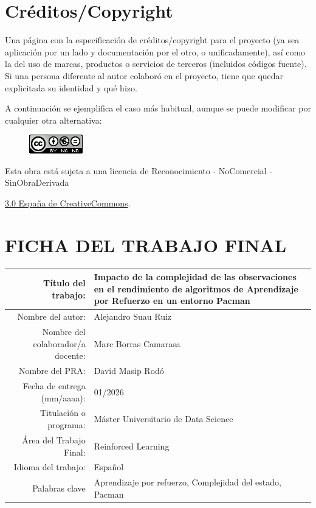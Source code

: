 \hypersetup{pageanchor=false}
\setcounter{page}{1} 
\pagestyle{plain}

\chapter*{Créditos/Copyright}

Una página con la especificación de créditos/copyright para el proyecto (ya sea aplicación por un lado y documentación por el otro, o unificadamente), así como la del uso de marcas, productos o servicios de terceros (incluidos códigos fuente). Si una persona diferente al autor colaboró en el proyecto, tiene que quedar explicitada su identidad y qué hizo.

A continuación se ejemplifica el caso más habitual, aunque se puede modificar por cualquier otra alternativa:

\vspace{1cm}

\begin{figure}[ht]
    \centering
	\includegraphics[scale=1]{images/license.png}
\end{figure}

Esta obra está sujeta a una licencia de Reconocimiento -  NoComercial - SinObraDerivada

\href{https://creativecommons.org/licenses/by-nc-nd/3.0/es/}{3.0 España de CreativeCommons}.

\chapter*{FICHA DEL TRABAJO FINAL}

\begin{table}[ht]
	\centering{}
	\renewcommand{\arraystretch}{2}
	\begin{tabular}{r | l}
		\hline
		Título del trabajo: & Impacto de la complejidad de las observaciones en el rendimiento de algoritmos de Aprendizaje por Refuerzo en un entorno Pacman\\
		\hline
        Nombre del autor: & Alejandro Suau Ruiz\\
		\hline
        Nombre del colaborador/a docente: & Marc Borras Camarasa\\
		\hline
        Nombre del PRA: & David Masip Rodó\\
		\hline
        Fecha de entrega (mm/aaaa): & 01/2026\\
		\hline
        Titulación o programa: & Máster Universitario de Data Science\\
		\hline
        Área del Trabajo Final: & Reinforced Learning\\
		\hline
        Idioma del trabajo: & Español\\
		\hline
        Palabras clave & Aprendizaje por refuerzo, Complejidad del estado, Pacman\\
		\hline
	\end{tabular}
\end{table}


